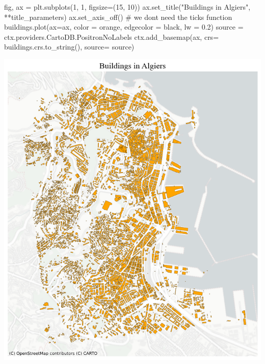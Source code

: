 \documentclass[
  letterpaper,
  DIV=11,
  numbers=noendperiod]{scrreprt}
\newenvironment{Shaded}{\begin{snugshade}}{\end{snugshade}}
\newcommand{\CommentTok}[1]{\textcolor[rgb]{0.37,0.37,0.37}{#1}}
\newcommand{\DecValTok}[1]{\textcolor[rgb]{0.68,0.00,0.00}{#1}}
\newcommand{\FloatTok}[1]{\textcolor[rgb]{0.68,0.00,0.00}{#1}}
\newcommand{\NormalTok}[1]{\textcolor[rgb]{0.00,0.23,0.31}{#1}}
\newcommand{\OperatorTok}[1]{\textcolor[rgb]{0.37,0.37,0.37}{#1}}
\newcommand{\StringTok}[1]{\textcolor[rgb]{0.13,0.47,0.30}{#1}}
\begin{document}
\begin{Shaded}
\begin{Highlighting}[]
\NormalTok{fig, ax }\OperatorTok{=}\NormalTok{ plt.subplots(}\DecValTok{1}\NormalTok{, }\DecValTok{1}\NormalTok{, figsize}\OperatorTok{=}\NormalTok{(}\DecValTok{15}\NormalTok{, }\DecValTok{10}\NormalTok{))}
\NormalTok{ax.set\_title(}\StringTok{"Buildings in Algiers"}\NormalTok{, }\OperatorTok{**}\NormalTok{title\_parameters)}
\NormalTok{ax.set\_axis\_off() }\CommentTok{\# we don\textquotesingle{}t need the ticks function}
\NormalTok{buildings.plot(ax}\OperatorTok{=}\NormalTok{ax, color }\OperatorTok{=} \StringTok{\textquotesingle{}orange\textquotesingle{}}\NormalTok{, edgecolor }\OperatorTok{=} \StringTok{\textquotesingle{}black\textquotesingle{}}\NormalTok{, lw }\OperatorTok{=} \FloatTok{0.2}\NormalTok{)}
\NormalTok{source }\OperatorTok{=}\NormalTok{ ctx.providers.CartoDB.PositronNoLabels}
\NormalTok{ctx.add\_basemap(ax, crs}\OperatorTok{=}\NormalTok{ buildings.crs.to\_string(), source}\OperatorTok{=}\NormalTok{ source)}
\end{Highlighting}
\end{Shaded}

\includegraphics{labs/w02_maps_files/figure-pdf/cell-16-output-1.png}
\end{document}
